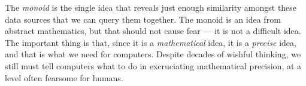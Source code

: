 The \emph{monoid} is the single idea that reveals just enough similarity amongst these data sources that we can query them together. The monoid is an idea from abstract mathematics, but that should not cause fear --- it is not a difficult idea. The important thing is that, since it is a \emph{mathematical} idea, it is a \emph{precise} idea, and that is what we need for computers. Despite decades of wishful thinking, we still must tell computers what to do in excruciating mathematical precision, at a level often fearsome for humans. 


\tableofcontents


